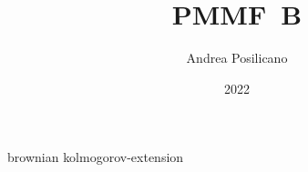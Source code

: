 \usepackage	{style}

\title	{PMMF~B}
\author	{Andrea Posilicano}
\date	{2022}


\maketitle
	{brownian}
\appendix
	{kolmogorov-extension}

